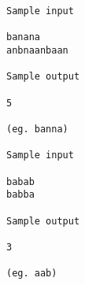 \begin{verbatim}
Sample input
 
banana 
anbnaanbaan 
 
Sample output
 
5 
 
(eg. banna) 

Sample input
 
babab 
babba 
 
Sample output
 
3 
 
(eg. aab) 
\end{verbatim}